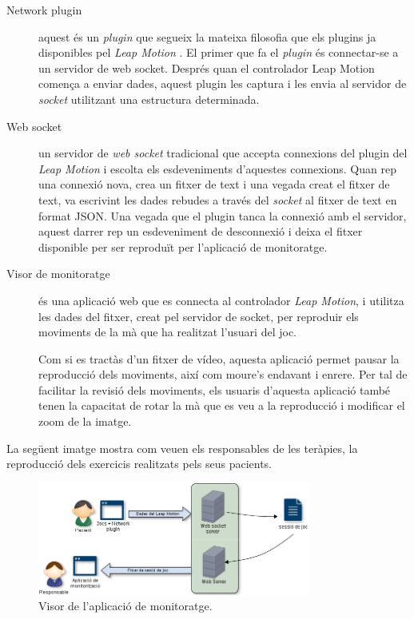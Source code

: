 \documentclass[12pt,a4paper,catalan]{article}
\begin{document}
	\begin{description}
		\item[Network plugin] aquest és un \textit{plugin} que segueix la mateixa filosofia que els plugins ja disponibles pel \textit{Leap Motion} \cite{leapjsplugins}. El primer que fa el \textit{plugin} és connectar-se a un servidor de web socket. Després quan el controlador Leap Motion comença a enviar dades, aquest plugin les captura i les envia al servidor de \textit{socket} utilitzant una estructura determinada.
		\item[Web socket] un servidor de \textit{web socket} tradicional que accepta connexions del plugin del \textit{Leap Motion} i escolta els esdeveniments d'aquestes connexions. Quan rep una connexió nova, crea un fitxer de text i una vegada creat el fitxer de text, va escrivint les dades rebudes a través del \textit{socket} al fitxer de text en format JSON. Una vegada que el plugin tanca la connexió amb el servidor, aquest darrer rep un esdeveniment de desconnexió i deixa el fitxer disponible per ser reproduït per l'aplicació de monitoratge.
		\item[Visor de monitoratge] és una aplicació web que es connecta al controlador \textit{Leap Motion}, i utilitza les dades del fitxer, creat pel servidor de socket, per reproduir els moviments de la mà que ha realitzat l'usuari del joc.
		
		Com si es tractàs d'un fitxer de vídeo, aquesta aplicació permet pausar la reproducció dels moviments, així com moure's endavant i enrere. Per tal de facilitar la revisió dels moviments, els usuaris d'aquesta aplicació també tenen la capacitat de rotar la mà que es veu a la reproducció i modificar el zoom de la imatge.
	\end{description}
	La següent imatge mostra com veuen els responsables de les teràpies, la reproducció dels exercicis realitzats pels seus pacients.
	\begin{figure}[H]
		\includegraphics[width=0.8\textwidth,keepaspectratio]{esquema-monitoritzacio.png}
		\centering
		\caption{Visor de l'aplicació de monitoratge.}
		\label{fig:playback-simple}
	\end{figure}
\end{document}
